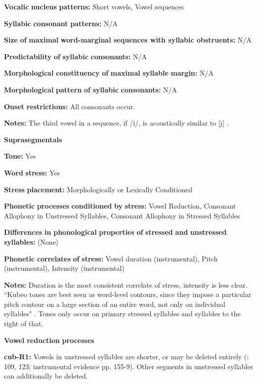 \textbf{Vocalic} \textbf{nucleus} \textbf{patterns:} Short vowels, Vowel sequences

\textbf{Syllabic} \textbf{consonant} \textbf{patterns:} N/A

\textbf{Size} \textbf{of} \textbf{maximal} \textbf{word{}-marginal sequences with syllabic obstruents:} N/A

\textbf{Predictability} \textbf{of} \textbf{syllabic} \textbf{consonants:} N/A

\textbf{Morphological} \textbf{constituency} \textbf{of} \textbf{maximal} \textbf{syllable} \textbf{margin:} N/A

\textbf{Morphological} \textbf{pattern} \textbf{of} \textbf{syllabic} \textbf{consonants:} N/A

\textbf{Onset} \textbf{restrictions:} All consonants occur.

\textbf{Notes:} The third vowel in a sequence, if /i/, is acoustically similar to [j] \citep[52]{Chacon2012}.

\textbf{Suprasegmentals}

\textbf{Tone:} Yes

\textbf{Word} \textbf{stress:} Yes

\textbf{Stress} \textbf{placement:} Morphologically or Lexically Conditioned

\textbf{Phonetic} \textbf{processes} \textbf{conditioned} \textbf{by} \textbf{stress:} Vowel Reduction, Consonant Allophony in Unstressed Syllables, Consonant Allophony in Stressed Syllables

\textbf{Differences} \textbf{in} \textbf{phonological} \textbf{properties} \textbf{of} \textbf{stressed} \textbf{and} \textbf{unstressed} \textbf{syllables:} (None)

\textbf{Phonetic} \textbf{correlates} \textbf{of} \textbf{stress:} Vowel duration (instrumental), Pitch (instrumental), Intensity (instrumental)

\textbf{Notes:} Duration is the most consistent correlate of stress, intensity is less clear. “Kubeo tones are best seen as word-level contours, since they impose a particular pitch contour on a large section of an entire word, not only on individual syllables" \citep[134]{Chacon2012}. Tones only occur on primary stressed syllables and syllables to the right of that.

\textbf{Vowel} \textbf{reduction} \textbf{processes}

\textbf{cub-R1:} Vowels in unstressed syllables are shorter, or may be deleted entirely (\citealt{Chacon2012}: 109, 123; instrumental evidence pp. 155-9). Other segments in unstressed syllables can additionally be deleted.


